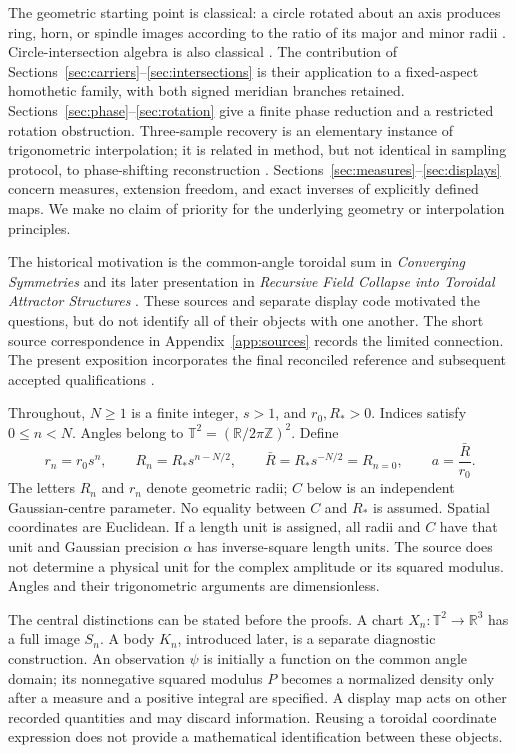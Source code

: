 \documentclass[11pt,a4paper]{article}
\theoremstyle{definition}
\theoremstyle{remark}
\newcommand{\R}{\mathbb R}
\newcommand{\T}{\mathbb T}
\begin{document}
The geometric starting point is classical: a circle rotated about an
axis produces ring, horn, or spindle images according to the ratio of
its major and minor radii \cite{weissteinTorus}. Circle-intersection
algebra is also classical \cite{weissteinCircles}. The contribution of
Sections~\ref{sec:carriers}--\ref{sec:intersections} is their application
to a fixed-aspect homothetic family, with both signed meridian branches
retained. Sections~\ref{sec:phase}--\ref{sec:rotation} give a finite
phase reduction and a restricted rotation obstruction.
Three-sample recovery is an elementary instance of trigonometric
interpolation; it is related in method, but not identical in sampling
protocol, to phase-shifting reconstruction \cite{chengWyant}.
Sections~\ref{sec:measures}--\ref{sec:displays} concern measures,
extension freedom, and exact inverses of explicitly defined maps.
We make no claim of priority for the underlying geometry or
interpolation principles.

The historical motivation is the common-angle toroidal sum in
\emph{Converging Symmetries} \cite{cs1,cs2} and its later presentation in
\emph{Recursive Field Collapse into Toroidal Attractor Structures}
\cite{rt}. These sources and separate display code motivated the
questions, but do not identify all of their objects with one another.
The short source correspondence in Appendix~\ref{app:sources} records
the limited connection. The present exposition incorporates the final
reconciled reference and subsequent accepted qualifications
\cite{reconciled,addendum,refinements}.

Throughout, $N\geq1$ is a finite integer, $s>1$, and $r_0,R_*>0$.
Indices satisfy $0\leq n<N$. Angles belong to
$\T^2=(\R/2\pi\mathbb Z)^2$. Define
\begin{equation}
 r_n=r_0s^n,\qquad R_n=R_*s^{n-N/2},\qquad
 \bar R=R_*s^{-N/2}=R_{n=0},\qquad a=\frac{\bar R}{r_0}.
 \label{eq:radii}
\end{equation}
The letters $R_n$ and $r_n$ denote geometric radii; $C$ below is an
independent Gaussian-centre parameter. No equality between $C$ and
$R_*$ is assumed. Spatial coordinates are Euclidean. If a length unit
is assigned, all radii and $C$ have that unit and Gaussian precision
$\alpha$ has inverse-square length units. The source does not determine
a physical unit for the complex amplitude or its squared modulus.
Angles and their trigonometric arguments are dimensionless.

The central distinctions can be stated before the proofs. A chart
$X_n:\T^2\to\R^3$ has a full image $S_n$. A body $K_n$, introduced later,
is a separate diagnostic construction. An observation $\psi$ is
initially a function on the common angle domain; its nonnegative
squared modulus $P$ becomes a normalized density only after a measure
and a positive integral are specified. A display map acts on other
recorded quantities and may discard information. Reusing a toroidal
coordinate expression does not provide a mathematical identification
between these objects.
\end{document}
